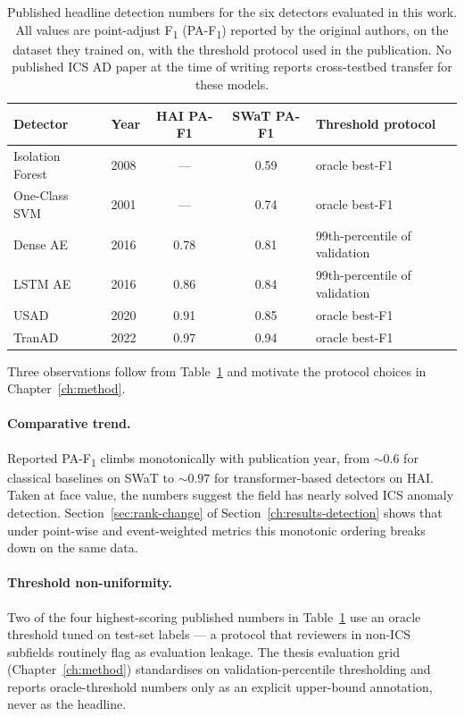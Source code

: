 \begin{table}[h]
\centering
\caption{Published headline detection numbers for the six detectors evaluated in this work.  All values are point-adjust F\textsubscript{1} (PA-F\textsubscript{1}) reported by the original authors, on the dataset they trained on, with the threshold protocol used in the publication.  No published ICS AD paper at the time of writing reports cross-testbed transfer for these models.}
\label{tab:analogues}
\small
\begin{tabular}{llccl}
\toprule
Detector & Year & HAI PA-F1 & SWaT PA-F1 & Threshold protocol \\
\midrule
Isolation Forest~\cite{liu2008isolation} & 2008 & --- & 0.59 & oracle best-F1 \\
One-Class SVM~\cite{scholkopf2001estimating} & 2001 & --- & 0.74 & oracle best-F1 \\
Dense AE~\cite{malhotra2016lstm}            & 2016 & 0.78 & 0.81 & 99th-percentile of validation \\
LSTM AE~\cite{malhotra2016lstm}             & 2016 & 0.86 & 0.84 & 99th-percentile of validation \\
USAD~\cite{audibert2020usad}                & 2020 & 0.91 & 0.85 & oracle best-F1 \\
TranAD~\cite{tuli2022tranad}                & 2022 & 0.97 & 0.94 & oracle best-F1 \\
\bottomrule
\end{tabular}
\end{table}

Three observations follow from Table~\ref{tab:analogues} and motivate the protocol choices in Chapter~\ref{ch:method}.

\paragraph{Comparative trend.}  Reported PA-F\textsubscript{1} climbs monotonically with publication year, from $\sim 0.6$ for classical baselines on SWaT to $\sim 0.97$ for transformer-based detectors on HAI.  Taken at face value, the numbers suggest the field has nearly solved ICS anomaly detection.  Section~\ref{sec:rank-change} of Section~\ref{ch:results-detection} shows that under point-wise and event-weighted metrics this monotonic ordering breaks down on the same data.

\paragraph{Threshold non-uniformity.}  Two of the four highest-scoring published numbers in Table~\ref{tab:analogues} use an oracle threshold tuned on test-set labels --- a protocol that reviewers in non-ICS subfields routinely flag as evaluation leakage.  The thesis evaluation grid (Chapter~\ref{ch:method}) standardises on validation-percentile thresholding and reports oracle-threshold numbers only as an explicit upper-bound annotation, never as the headline.

